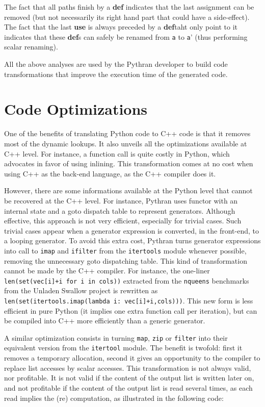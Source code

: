 \documentclass[10pt, onecolumn, preprint]{sigplanconf}
\begin{document}
The fact that all paths finish by a \textbf{def} indicates that the last
assignment can be removed (but not necessarily its right hand part that could
have a side-effect). The fact that the last \textbf{use} is always preceded by
a \textbf{def}taht only point to it indicates that these \textbf{def}s can
safely be renamed from \texttt{a} to \texttt{a}' (thus performing scalar
renaming).

All the above analyses are used by the Pythran developer to build code
transformations that improve the execution time of the generated code.

\section{Code Optimizations}
\label{sec:optimizations}

One of the benefits of translating Python code to C++ code is that it removes
most of the dynamic lookups. It also unveils all the optimizations available at
C++ level. For instance, a function call is quite costly in Python, which
advocates in favor of using inlining. This transformation comes at no cost when
using C++ as the back-end language, as the C++ compiler does it.

However, there are some informations available at the Python level that cannot
be recovered at the C++ level. For instance, Pythran uses functor with an
internal state and a goto dispatch table to represent generators. Although
effective, this approach is not very efficient, especially for trivial cases.
Such trivial cases appear when a generator expression is converted, in the
front-end, to a looping generator. To avoid this extra cost, Pythran turns
generator expressions into call to \texttt{imap} and \texttt{ifilter} from the
\texttt{itertools} module whenever possible, removing the unnecessary goto
dispatching table. This kind of transformation cannot be made by the C++
compiler. For instance, the one-liner \texttt{len(set(vec[i]+i for i in cols))}
extracted from the \texttt{nqueens} benchmarks from the Unladen Swallow project
is rewritten as \texttt{len(set(itertools.imap(lambda i: vec[i]+i,cols)))}.
This new form is less efficient in pure Python (it implies one extra function
call per iteration), but can be compiled into C++ more efficiently than a
generic generator.

A similar optimization consists in turning \texttt{map}, \texttt{zip} or
\texttt{filter} into their equivalent version from the \texttt{itertool}
module. The benefit is twofold: first it removes a temporary allocation, second
it gives an opportunity to the compiler to replace list accesses by scalar
accesses. This transformation is not always valid, nor profitable. It is not
valid if the content of the output list is written later on, and not profitable
if the content of the output list is read several times, as each read implies
the (re) computation, as illustrated in the following code:
\end{document}
